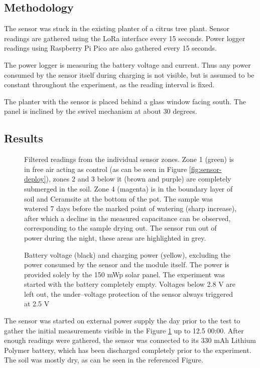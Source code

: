\subsection{Methodology}
The sensor was stuck in the existing planter of a citrus tree plant. Sensor readings are gathered using the LoRa interface every 15 seconds. Power logger readings using Raspberry Pi Pico are also gathered every 15 seconds. 

The power logger is measuring the battery voltage and current. Thus any power consumed by the sensor itself during charging is not visible, but is assumed to be constant throughout the experiment, as the reading interval is fixed.

The planter with the sensor is placed behind a glass window facing south. The panel is inclined by the swivel mechanism at about 30 degrees.

\subsection{Results}
\begin{figure}[p]
    
    \caption{\label{fig:sensor-log}Filtered readings from the individual sensor zones. Zone 1 (green) is in free air acting as control (as can be seen in Figure \ref{fig:sensor-deploy}), zones 2 and 3 below it (brown and purple) are completely submerged in the soil. Zone 4 (magenta) is in the boundary layer of soil and Ceramsite at the bottom of the pot. The sample was watered 7 days before the marked point of watering (sharp increase), after which a decline in the measured capacitance can be observed, corresponding to the sample drying out. The sensor run out of power during the night, these areas are highlighted in grey.}
\end{figure}
\begin{figure}[p]
    
    \caption{\label{fig:power-log}Battery voltage (black) and charging power (yellow), excluding the power consumed by the sensor and the module itself. The power is provided solely by the 150 mWp solar panel. The experiment was started with the battery completely empty. Voltages below 2.8 V are left out, the under--voltage protection of the sensor always triggered at 2.5 V}
\end{figure}

The sensor was started on external power supply the day prior to the test to gather the initial measurements visible in the Figure \ref{fig:sensor-log} up to 12.5 00:00. After enough readings were gathered, the sensor was connected to its 330 mAh Lithium Polymer battery, which has been discharged completely prior to the experiment. The soil was mostly dry, as can be seen in the referenced Figure.

